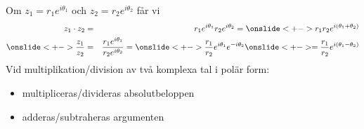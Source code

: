 \documentclass[slidestop,blue,handout,9pt]{beamer}
\begin{document}
\begin{frame}
\onslide<+->
Om $z_1 = r_1e^{i\theta_1}$ och $z_2 = r_2e^{i\theta_2}$ får vi 
\onslide<+->
\begin{eqnarray*}
z_1\cdot z_2& =& r_1e^{i\theta_1}r_2e^{i\theta_2} = \onslide<+-> r_1r_2e^{i(\theta_{1}+\theta_{2})} \\
\onslide<+-> \frac{z_{1}}{z_{2}}& =&\frac{r_{1}e^{i\theta _{1}}}{r_{2}e^{i\theta _{2}}}=
\onslide<+->
\frac{r_{1}}{r_{2}}e^{i\theta _{1}}e^{-i\theta _{2}}
\onslide<+-> =\frac{r_{1}}{r_{2}}e^{i(\theta _{1}-\theta_{2})}
\end{eqnarray*}
\onslide<+->
Vid {\color{hhgreen}multiplikation}/{\color{hhblue1}division} av två komplexa tal i
polär form:
\begin{itemize}
\item {\color{hhgreen}multipliceras}/{\color{hhblue1}divideras}
 absolutbeloppen
\item {\color{hhgreen}adderas}/{\color{hhblue1}subtraheras} argumenten
\end{itemize}
\end{frame}
\end{document}
